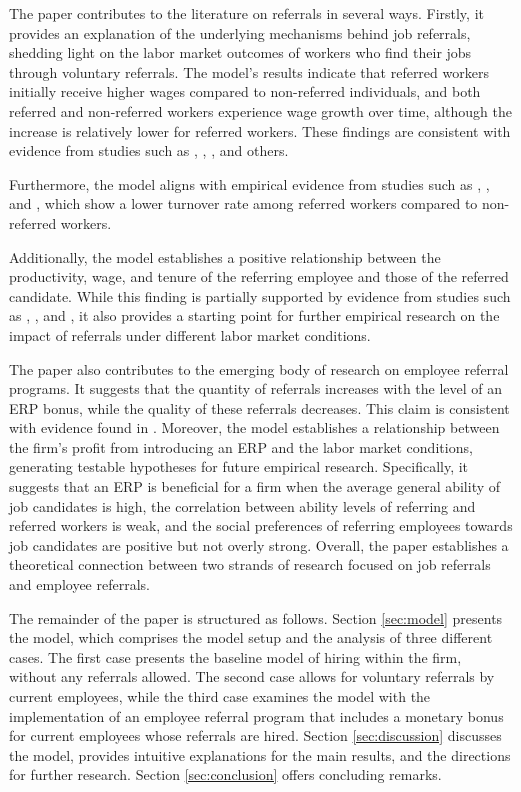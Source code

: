 \documentclass[12pt]{article}
\begin{document}
The paper contributes to the literature on referrals in several ways. Firstly, it provides an explanation of the underlying mechanisms behind job referrals, shedding light on the labor market outcomes of workers who find their jobs through voluntary referrals. The model's results indicate that referred workers initially receive higher wages compared to non-referred individuals, and both referred and non-referred workers experience wage growth over time, although the increase is relatively lower for referred workers. These findings are consistent with evidence from studies such as \cite{corcoran1980most}, \cite{montgomery1991social}, \cite{dustmann2016referral}, and others.

Furthermore, the model aligns with empirical evidence from studies such as \cite{pallais2016referential}, \cite{lalanne2016old}, and \cite{lalanne2021social}, which show a lower turnover rate among referred workers compared to non-referred workers.

Additionally, the model establishes a positive relationship between the productivity, wage, and tenure of the referring employee and those of the referred candidate. While this finding is partially supported by evidence from studies such as \cite{kugler2003employee}, \cite{lalanne2016old}, and \cite{levati2020impact}, it also provides a starting point for further empirical research on the impact of referrals under different labor market conditions.

The paper also contributes to the emerging body of research on employee referral programs. It suggests that the quantity of referrals increases with the level of an ERP bonus, while the quality of these referrals decreases. This claim is consistent with evidence found in \cite{friebel2023employee}. Moreover, the model establishes a relationship between the firm's profit from introducing an ERP and the labor market conditions, generating testable hypotheses for future empirical research. Specifically, it suggests that an ERP is beneficial for a firm when the average general ability of job candidates is high, the correlation between ability levels of referring and referred workers is weak, and the social preferences of referring employees towards job candidates are positive but not overly strong. Overall, the paper establishes a theoretical connection between two strands of research focused on job referrals and employee referrals.

The remainder of the paper is structured as follows. Section \ref{sec:model} presents the model, which comprises the model setup and the analysis of three different cases. The first case presents the baseline model of hiring within the firm, without any referrals allowed. The second case allows for voluntary referrals by current employees, while the third case examines the model with the implementation of an employee referral program that includes a monetary bonus for current employees whose referrals are hired. Section \ref{sec:discussion} discusses the model, provides intuitive explanations for the main results, and the directions for further research. Section \ref{sec:conclusion} offers concluding remarks.
\end{document}
